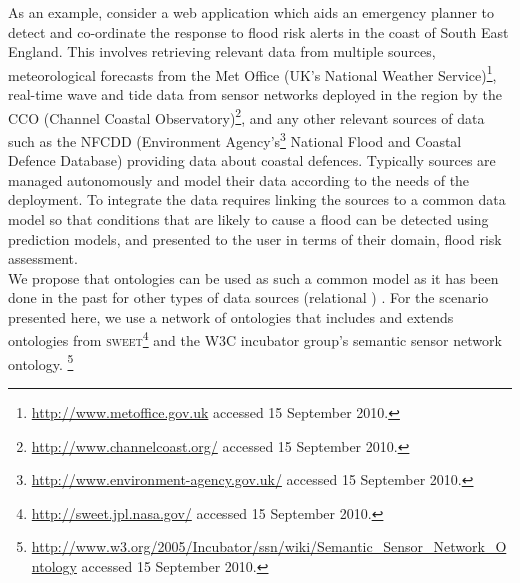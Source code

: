 As an example, consider a web application which aids an emergency planner to detect and co-ordinate the response to flood risk alerts in the coast of South East England. 
This involves retrieving relevant data from multiple sources, \eg meteorological forecasts from the Met Office (UK's National Weather Service)\footnote{\url{http://www.metoffice.gov.uk} accessed 15 September 2010.}, real-time wave and tide data from sensor networks deployed in the region by the \textsc{CCO} (Channel Coastal Observatory)\footnote{\url{http://www.channelcoast.org/} accessed 15 September 2010.}, and any other relevant sources of data such as the \textsc{NFCDD} (Environment Agency's\footnote{\url{http://www.environment-agency.gov.uk/} accessed 15 September 2010.} National Flood and Coastal Defence Database)  providing
data about coastal defences. 
Typically sources are managed autonomously and model their data according to the needs of the deployment. 
To integrate the data requires linking the sources to a common data model so that conditions that are likely to cause a flood can be detected using prediction models, and presented to the user in terms of their domain, \eg flood risk assessment. \\


We propose that ontologies can be used as such a common model as it has been done in the past for other types of data sources (\eg relational \cite{Wache_01}) . 
For the scenario presented here, we use a network of ontologies that includes and extends ontologies from \textsc{sweet}\footnote{\url{http://sweet.jpl.nasa.gov/} accessed 15 September 2010.} and the W3C incubator group's semantic sensor network ontology.
\footnote{\url{http://www.w3.org/2005/Incubator/ssn/wiki/Semantic_Sensor_Network_Ontology} accessed 15 September 2010.}

